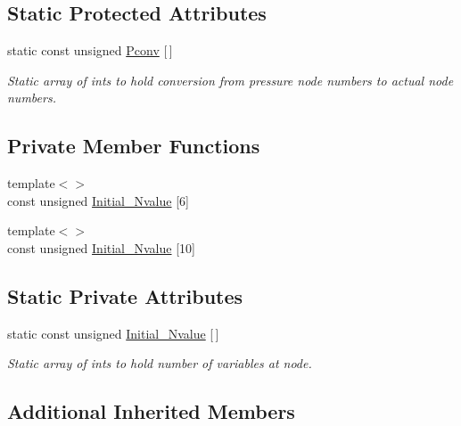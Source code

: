 \subsection*{Static Protected Attributes}
\begin{DoxyCompactItemize}
\item 
static const unsigned \hyperlink{classoomph_1_1GeneralisedNewtonianTTaylorHoodElement_a7a86c1512d4f24cc56ddb2dc1fffc095}{Pconv} \mbox{[}$\,$\mbox{]}
\begin{DoxyCompactList}\small\item\em Static array of ints to hold conversion from pressure node numbers to actual node numbers. \end{DoxyCompactList}\end{DoxyCompactItemize}
\subsection*{Private Member Functions}
\begin{DoxyCompactItemize}
\item 
{\footnotesize template$<$$>$ }\\const unsigned \hyperlink{classoomph_1_1GeneralisedNewtonianTTaylorHoodElement_ab1a7f38270a1c40e6116b5ef8a003c0c}{Initial\+\_\+\+Nvalue} \mbox{[}6\mbox{]}
\item 
{\footnotesize template$<$$>$ }\\const unsigned \hyperlink{classoomph_1_1GeneralisedNewtonianTTaylorHoodElement_a7009faa7524ac033a766186ae7584652}{Initial\+\_\+\+Nvalue} \mbox{[}10\mbox{]}
\end{DoxyCompactItemize}
\subsection*{Static Private Attributes}
\begin{DoxyCompactItemize}
\item 
static const unsigned \hyperlink{classoomph_1_1GeneralisedNewtonianTTaylorHoodElement_a2037dd72fff542c5976df782653378be}{Initial\+\_\+\+Nvalue} \mbox{[}$\,$\mbox{]}
\begin{DoxyCompactList}\small\item\em Static array of ints to hold number of variables at node. \end{DoxyCompactList}\end{DoxyCompactItemize}
\subsection*{Additional Inherited Members}


